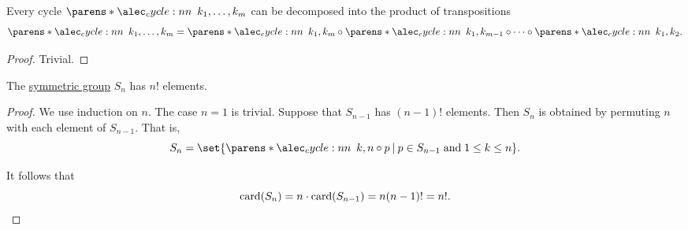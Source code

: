 \begin{proposition}\label{thm:cycle_transposition_decomposition}
  Every cycle \( \cycle{ k_1, \ldots, k_m } \) can be decomposed into the product of transpositions
  \begin{equation*}
    \cycle{ k_1, \ldots, k_m } = \cycle{ k_1, k_m } \bincirc \cycle{ k_1, k_{m-1} } \bincirc \cdots \bincirc \cycle{ k_1, k_2 }.
  \end{equation*}
\end{proposition}
\begin{proof}
  Trivial.
\end{proof}

\begin{proposition}\label{thm:symmetric_group_cardinality}
  The \hyperref[def:symmetric_group]{symmetric group} \( S_n \) has \( n! \) elements.
\end{proposition}
\begin{proof}
  We use induction on \( n \). The case \( n = 1 \) is trivial. Suppose that \( S_{n-1} \) has \( (n-1)! \) elements. Then \( S_n \) is obtained by permuting \( n \) with each element of \( S_{n-1} \). That is,
  \begin{equation*}
    S_n = \set{ \cycle{ k, n } \bincirc p \given p \in S_{n-1} \T{and} 1 \leq k \leq n }.
  \end{equation*}

  It follows that
  \begin{equation*}
    \operatorname{card}(S_n) = n \cdot \operatorname{card}(S_{n-1}) = n (n-1)! = n!.
  \end{equation*}
\end{proof}


